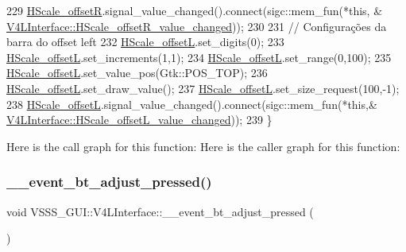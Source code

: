 \begin{DoxyCode}
229         \hyperlink{class_v_s_s_s___g_u_i_1_1_v4_l_interface_a50fa202e4b9ec95b2c009a324aea10fb}{HScale\_offsetR}.signal\_value\_changed().connect(sigc::mem\_fun(*\textcolor{keyword}{this}, &
      \hyperlink{class_v_s_s_s___g_u_i_1_1_v4_l_interface_aee8d612db51e54e9fdcd13fe97dac999}{V4LInterface::HScale\_offsetR\_value\_changed}));
230 
231         \textcolor{comment}{// Configurações da barra do offset left}
232         \hyperlink{class_v_s_s_s___g_u_i_1_1_v4_l_interface_a7261b87cb8ad1293c79003c48c99558a}{HScale\_offsetL}.set\_digits(0);
233         \hyperlink{class_v_s_s_s___g_u_i_1_1_v4_l_interface_a7261b87cb8ad1293c79003c48c99558a}{HScale\_offsetL}.set\_increments(1,1);
234         \hyperlink{class_v_s_s_s___g_u_i_1_1_v4_l_interface_a7261b87cb8ad1293c79003c48c99558a}{HScale\_offsetL}.set\_range(0,100);
235         \hyperlink{class_v_s_s_s___g_u_i_1_1_v4_l_interface_a7261b87cb8ad1293c79003c48c99558a}{HScale\_offsetL}.set\_value\_pos(Gtk::POS\_TOP);
236         \hyperlink{class_v_s_s_s___g_u_i_1_1_v4_l_interface_a7261b87cb8ad1293c79003c48c99558a}{HScale\_offsetL}.set\_draw\_value();
237         \hyperlink{class_v_s_s_s___g_u_i_1_1_v4_l_interface_a7261b87cb8ad1293c79003c48c99558a}{HScale\_offsetL}.set\_size\_request(100,-1);
238         \hyperlink{class_v_s_s_s___g_u_i_1_1_v4_l_interface_a7261b87cb8ad1293c79003c48c99558a}{HScale\_offsetL}.signal\_value\_changed().connect(sigc::mem\_fun(*\textcolor{keyword}{this},&
      \hyperlink{class_v_s_s_s___g_u_i_1_1_v4_l_interface_a52c94944c17c9ceaba03dd8f2f1849bf}{V4LInterface::HScale\_offsetL\_value\_changed}));
239     \}
\end{DoxyCode}
Here is the call graph for this function\+:
Here is the caller graph for this function\+:
\mbox{\label{class_v_s_s_s___g_u_i_1_1_v4_l_interface_ab8a8006db395031e305519fd3e199928}} 
\subsubsection{\texorpdfstring{\+\_\+\+\_\+event\+\_\+bt\+\_\+adjust\+\_\+pressed()}{\_\_event\_bt\_adjust\_pressed()}}
{\footnotesize\ttfamily void V\+S\+S\+S\+\_\+\+G\+U\+I\+::\+V4\+L\+Interface\+::\+\_\+\+\_\+event\+\_\+bt\+\_\+adjust\+\_\+pressed (\begin{DoxyParamCaption}{ }\end{DoxyParamCaption})}



